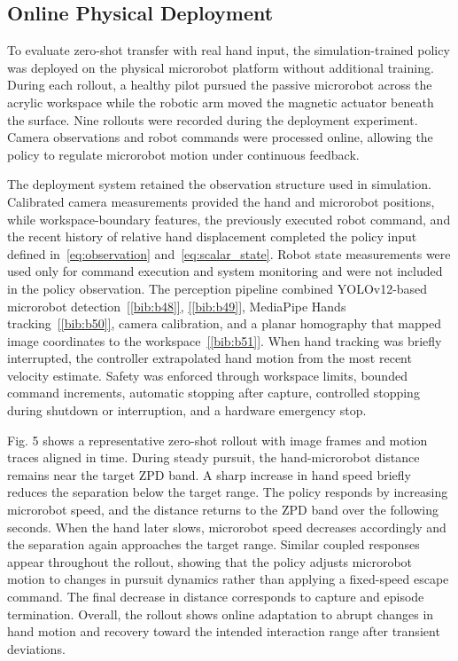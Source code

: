 \documentclass[journal,twoside,web]{ieeecolor2}
\newcommand{\citelink}[1]{\hyperref[bib:#1]{[\ref*{bib:#1}]}}
\begin{document}
\subsection{Online Physical Deployment}
To evaluate zero-shot transfer with real hand input, the simulation-trained policy was deployed on the physical microrobot platform without additional training. During each rollout, a healthy pilot pursued the passive microrobot across the acrylic workspace while the robotic arm moved the magnetic actuator beneath the surface. Nine rollouts were recorded during the deployment experiment. Camera observations and robot commands were processed online, allowing the policy to regulate microrobot motion under continuous feedback.

The deployment system retained the observation structure used in simulation. Calibrated camera measurements provided the hand and microrobot positions, while workspace-boundary features, the previously executed robot command, and the recent history of relative hand displacement completed the policy input defined in~\eqref{eq:observation} and~\eqref{eq:scalar_state}. Robot state measurements were used only for command execution and system monitoring and were not included in the policy observation. The perception pipeline combined YOLOv12-based microrobot detection~\citelink{b48}, \citelink{b49}, MediaPipe Hands tracking~\citelink{b50}, camera calibration, and a planar homography that mapped image coordinates to the workspace~\citelink{b51}. When hand tracking was briefly interrupted, the controller extrapolated hand motion from the most recent velocity estimate. Safety was enforced through workspace limits, bounded command increments, automatic stopping after capture, controlled stopping during shutdown or interruption, and a hardware emergency stop.

Fig. 5 shows a representative zero-shot rollout with image frames and motion traces aligned in time. During steady pursuit, the hand-microrobot distance remains near the target ZPD band. A sharp increase in hand speed briefly reduces the separation below the target range. The policy responds by increasing microrobot speed, and the distance returns to the ZPD band over the following seconds. When the hand later slows, microrobot speed decreases accordingly and the separation again approaches the target range. Similar coupled responses appear throughout the rollout, showing that the policy adjusts microrobot motion to changes in pursuit dynamics rather than applying a fixed-speed escape command. The final decrease in distance corresponds to capture and episode termination. Overall, the rollout shows online adaptation to abrupt changes in hand motion and recovery toward the intended interaction range after transient deviations.
\end{document}
